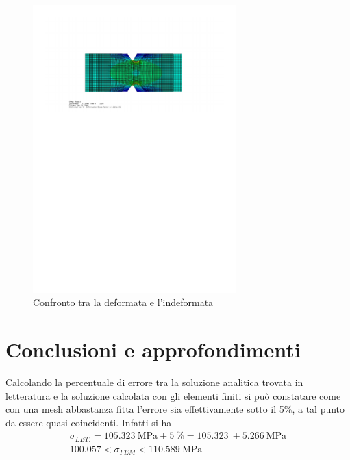 \begin{figure}[htb]
    \centering
    \includegraphics[width=0.7\textwidth]{rel2/img2/DeformataIndeformata.pdf}
    \caption{Confronto tra la deformata e l'indeformata}
    \label{fig:DeformataIndeformata}
\end{figure}
\section{Conclusioni e approfondimenti}
Calcolando la percentuale di errore tra la soluzione analitica trovata in letteratura e la soluzione calcolata con gli elementi finiti si può constatare come con una mesh abbastanza fitta l’errore sia effettivamente sotto il 5\%, a tal punto da essere quasi coincidenti.
Infatti si ha
\begin{gather*}
    \sigma_{LET.} = \SI{105.323}{\mega\pascal} \pm \SI{5}{\%} = \SI{105.323}{} \pm \SI{5.266}{\mega\pascal} \\
    100.057 < \sigma_{FEM} < \SI{110.589}{\mega\pascal}
\end{gather*}

